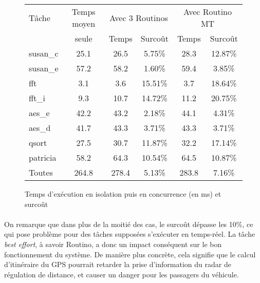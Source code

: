 \begin{figure}
\centering
\begin{tabular}{l|c|c|c|c|c}
Tâche & Temps moyen & \multicolumn{2}{c|}{Avec 3 Routinos} & 
\multicolumn{2}{c}{Avec Routino MT} \\
 & seule & Temps & Surcoût & Temps & Surcoût\\
\hline
susan\_c & 25.1 & 26.5 & 5.75\%  & 28.3 & 12.87\%\\
susan\_e & 57.2 & 58.2 & 1.60\%  & 59.4 & 3.85\%\\
fft      & 3.1  & 3.6  & 15.51\% & 3.7  & 18.64\%\\
fft\_i   & 9.3  & 10.7 & 14.72\% & 11.2 & 20.75\%\\
aes\_e   & 42.2 & 43.2 & 2.18\%  & 44.1 & 4.31\%\\
aes\_d   & 41.7 & 43.3 & 3.71\%  & 43.3 & 3.71\%\\
qsort    & 27.5 & 30.7 & 11.87\% & 32.2 & 17.14\%\\
patricia & 58.2 & 64.3 & 10.54\% & 64.5 & 10.87\%\\
\hline
Toutes   & 264.8 & 278.4 & 5.13\%  & 283.8 & 7.16\%\\
\end{tabular}
\caption{Temps d'exécution en isolation puis en concurrence (en ms) et surcoût}
\label{timebench}
\end{figure}

\paragraph{}
On remarque que dans plus de la moitié des cas, le surcoût dépasse les 10\%, ce
qui pose problème pour des tâches supposées s'exécuter en temps-réel. La tâche
\textit{best effort}, à savoir Routino, a donc un impact conséquent sur le bon
fonctionnement du système. De manière plus concrète, cela signifie que le 
calcul d'itinéraire du GPS pourrait retarder la prise d'information du radar
de régulation de distance, et causer un danger pour les passagers du véhicule.

